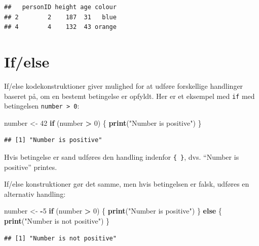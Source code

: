 \documentclass[
]{book}
\newenvironment{Shaded}{\begin{snugshade}}{\end{snugshade}}
\newcommand{\ControlFlowTok}[1]{\textcolor[rgb]{0.13,0.29,0.53}{\textbf{#1}}}
\newcommand{\DecValTok}[1]{\textcolor[rgb]{0.00,0.00,0.81}{#1}}
\newcommand{\FunctionTok}[1]{\textcolor[rgb]{0.13,0.29,0.53}{\textbf{#1}}}
\newcommand{\NormalTok}[1]{#1}
\newcommand{\OtherTok}[1]{\textcolor[rgb]{0.56,0.35,0.01}{#1}}
\newcommand{\SpecialCharTok}[1]{\textcolor[rgb]{0.81,0.36,0.00}{\textbf{#1}}}
\newcommand{\StringTok}[1]{\textcolor[rgb]{0.31,0.60,0.02}{#1}}
\begin{document}
\begin{verbatim}
##   personID height age colour
## 2        2    187  31   blue
## 4        4    132  43 orange
\end{verbatim}

\section{If/else}\label{ifelse}

If/else kodekonstruktioner giver mulighed for at udføre forskellige handlinger baseret på, om en bestemt betingelse er opfyldt. Her er et eksempel med \texttt{if} med betingelsen \texttt{number\ \textgreater{}\ 0}:

\begin{Shaded}
\begin{Highlighting}[]
\NormalTok{number }\OtherTok{\textless{}{-}} \DecValTok{42}
\ControlFlowTok{if}\NormalTok{ (number }\SpecialCharTok{\textgreater{}} \DecValTok{0}\NormalTok{) \{}
  \FunctionTok{print}\NormalTok{(}\StringTok{"Number is positive"}\NormalTok{)}
\NormalTok{\}}
\end{Highlighting}
\end{Shaded}

\begin{verbatim}
## [1] "Number is positive"
\end{verbatim}

Hvis betingelse er sand udføres den handling indenfor \texttt{\{\ \}}, dvs. ``Number is positive'' printes.

If/else konstruktioner gør det samme, men hvis betingelsen er falsk, udføres en alternativ handling:

\begin{Shaded}
\begin{Highlighting}[]
\NormalTok{number }\OtherTok{\textless{}{-}} \SpecialCharTok{{-}}\DecValTok{5}
\ControlFlowTok{if}\NormalTok{ (number }\SpecialCharTok{\textgreater{}} \DecValTok{0}\NormalTok{) \{}
  \FunctionTok{print}\NormalTok{(}\StringTok{"Number is positive"}\NormalTok{)}
\NormalTok{\} }\ControlFlowTok{else}\NormalTok{ \{}
  \FunctionTok{print}\NormalTok{(}\StringTok{"Number is not positive"}\NormalTok{)}
\NormalTok{\}}
\end{Highlighting}
\end{Shaded}

\begin{verbatim}
## [1] "Number is not positive"
\end{verbatim}
\end{document}
